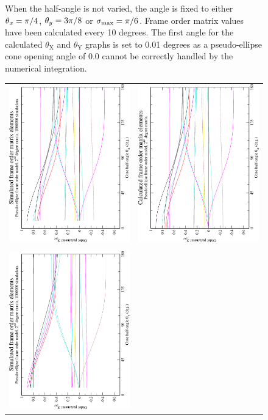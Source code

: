 \begin{figure}
{    When the half-angle is not varied, the angle is fixed to either $\theta_x = \pi/4$, $\theta_y = 3\pi/8$ or $\sigma_\textrm{max} = \pi/6$.
    Frame order matrix values have been calculated every 10 degrees.
    The first angle for the calculated $\theta_\textrm{X}$ and $\theta_\textrm{Y}$ graphs is set to 0.01 degrees as a pseudo-ellipse cone opening angle of 0.0 cannot be correctly handled by the numerical integration.
  }
  \label{fig: simulated and calculated in-frame 1st degree pseudo-ellipse frame order}
\end{figure}

\begin{figure}
\centering
  \begin{tabular}{@{}cc@{}}
    \includegraphics[width=.35\textwidth,angle=270]{images/frame_order_matrix/Sijkl_pseudo-ellipse_in_frame_theta_x_ens1000000.eps} &
    \includegraphics[width=.35\textwidth,angle=270]{images/frame_order_matrix/Sijkl_pseudo-ellipse_in_frame_theta_x_calc.eps} \\
    \\[-5pt]
    \includegraphics[width=.35\textwidth,angle=270]{images/frame_order_matrix/Sijkl_pseudo-ellipse_in_frame_theta_y_ens1000000.eps} &

\end{tabular}
\end{figure}
